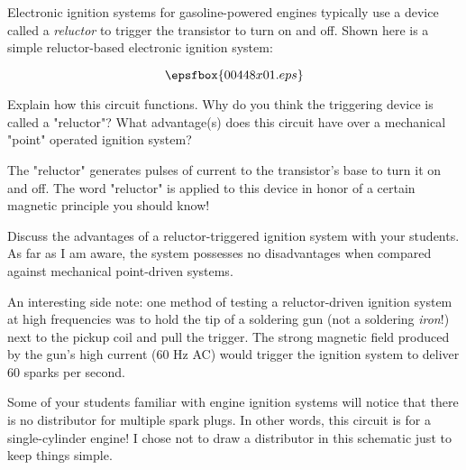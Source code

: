 

Electronic ignition systems for gasoline-powered engines typically use a device called a {\it reluctor} to trigger the transistor to turn on and off.  Shown here is a simple reluctor-based electronic ignition system:

$$\epsfbox{00448x01.eps}$$

Explain how this circuit functions.  Why do you think the triggering device is called a "reluctor"?  What advantage(s) does this circuit have over a mechanical "point" operated ignition system?







The "reluctor" generates pulses of current to the transistor's base to turn it on and off.  The word "reluctor" is applied to this device in honor of a certain magnetic principle you should know!







Discuss the advantages of a reluctor-triggered ignition system with your students.  As far as I am aware, the system possesses no disadvantages when compared against mechanical point-driven systems.  

An interesting side note: one method of testing a reluctor-driven ignition system at high frequencies was to hold the tip of a soldering gun (not a soldering {\it iron}!) next to the pickup coil and pull the trigger.  The strong magnetic field produced by the gun's high current (60 Hz AC) would trigger the ignition system to deliver 60 sparks per second.

Some of your students familiar with engine ignition systems will notice that there is no distributor for multiple spark plugs.  In other words, this circuit is for a single-cylinder engine!  I chose not to draw a distributor in this schematic just to keep things simple.




